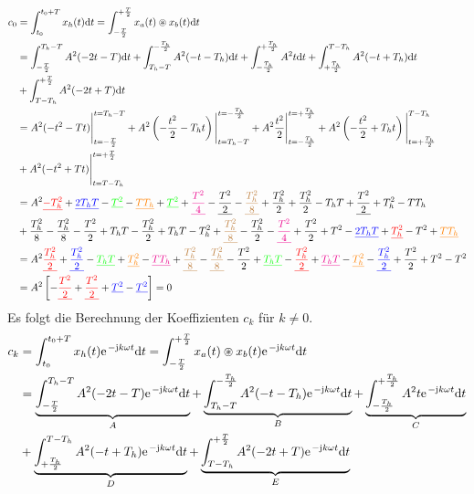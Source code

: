 \documentclass[11pt,a4paper,DIV=12]{scrartcl}
\begin{document}
\begin{align}
	c_0&=\int_{t_0}^{t_0+T}x_{h}(t)\mathrm{d} t=
	\int_{-\frac{T}{2}}^{+\frac{T}{2}}x_{a}(t)\circledast x_{b}(t)\mathrm{d} t \nonumber \\
	&=\int_{-\frac{T}{2}}^{T_h-T}A^2(-2t-T)\mathrm{d} t+\int_{T_h-T}^{-\frac{T_h}{2}}A^2(-t-T_h)\mathrm{d} t
	+\int_{-\frac{T_h}{2}}^{+\frac{T_h}{2}}A^2t\mathrm{d} t
	+\int_{+\frac{T_h}{2}}^{T-T_h}A^2(-t+T_h)\mathrm{d} t\nonumber \\
	&+\int_{T-T_h}^{+\frac{T}{2}}A^2(-2t+T)\mathrm{d} t\nonumber \\
	&=A^2(-t^2-Tt)\Bigg |_{t=-\frac{T}{2}}^{t=T_h-T}
	+A^2\left(-\frac{t^2}{2}-T_ht\right)\Bigg |_{t=T_h-T}^{t=-\frac{T_h}{2}}
	+A^2\frac{t^2}{2}\Bigg |_{t=-\frac{T_h}{2}}^{t=+\frac{T_h}{2}}
	+A^2\left(-\frac{t^2}{2}+T_ht\right)\Bigg |_{t=+\frac{T_h}{2}}^{T-T_h}\nonumber \\
	&+A^2(-t^2+Tt)\Bigg |_{t=T-T_h}^{t=+\frac{T}{2}} \nonumber \\
	&=A^2 \textcolor{red}{\underline{-T_h^2}}+\textcolor{blue}{\underline{2T_hT}}-\textcolor{green}{\underline{T^2}}-\textcolor{orange}{\underline{TT_h}}+\textcolor{green}{\underline{T^2}}+\textcolor{magenta}{\underline{\frac{T^2}{4}}}-\textcolor{black}{\underline{\frac{T^2}{2}}}-\textcolor{brown}{\underline{\frac{T_h^2}{8}}}+\frac{T_h^2}{2}+\frac{T_h^2}{2}-T_hT+\textcolor{black}{\underline{\frac{T^2}{2}}}+T_h^2-TT_h\nonumber \\
	&+\frac{T_h^2}{8}-\frac{T_h^2}{8}-\frac{T^2}{2}+T_hT-\frac{T_h^2}{2}+T_hT-T_h^2+\textcolor{brown}{\underline{\frac{T_h^2}{8}}}-\frac{T_h^2}{2}-\textcolor{magenta}{\underline{\frac{T^2}{4}}}+\frac{T^2}{2}+T^2-\textcolor{blue}{\underline{2T_hT}}+\textcolor{red}{\underline{T_h^2}}-T^2+\textcolor{orange}{\underline{TT_h}}\nonumber \\
	&=A^2\textcolor{red}{\underline{\frac{T_h^2}{2}}}+\textcolor{blue}{\underline{\frac{T_h^2}{2}}}-\textcolor{green}{\underline{T_hT}}+\textcolor{orange}{\underline{T_h^2}}-\textcolor{magenta}{\underline{TT_h}}+\textcolor{brown}{\underline{\frac{T_h^2}{8}}}-\textcolor{brown}{\underline{\frac{T_h^2}{8}}}-\frac{T^2}{2}+\textcolor{green}{\underline{T_hT}}-\textcolor{red}{\underline{\frac{T_h^2}{2}}}+\textcolor{magenta}{\underline{T_hT}}-\textcolor{orange}{\underline{T_h^2}}-\textcolor{blue}{\underline{\frac{T_h^2}{2}}}+\frac{T^2}{2}+T^2-T^2 \nonumber \\
	&=A^2\left [-\textcolor{red}{\underline{\frac{T^2}{2}}}+\textcolor{red}{\underline{\frac{T^2}{2}}}+\textcolor{blue}{\underline{T^2}}-\textcolor{blue}{\underline{T^2}}\right] = 0
\end{align}
%
%
%
Es folgt die Berechnung der Koeffizienten $c_k$ für $k\neq 0$.
%
%
%
\begin{align}
	c_k&=\int_{t_0}^{t_0+T}x_{h}(t)\e^{-\im k \omega t}\diff t
	=\int_{-\frac{T}{2}}^{+\frac{T}{2}}x_{a}(t)\circledast x_{b}(t)\e^{-\im k \omega t}\diff t\nonumber \\
	&=\underbrace{\int_{-\frac{T}{2}}^{T_h-T}A^2(-2t-T)\e^{-\im k \omega t}\diff t}_A+\underbrace{\int_{T_h-T}^{-\frac{T_h}{2}}A^2(-t-T_h)\e^{-\im k \omega t}\diff t}_B+\underbrace{\int_{-\frac{T_h}{2}}^{+\frac{T_h}{2}}A^2t\e^{-\im k \omega t}\diff t}_C\nonumber \\
	&+\underbrace{\int_{+\frac{T_h}{2}}^{T-T_h}A^2(-t+T_h)\e^{-\im k \omega t}\diff t}_D +\underbrace{\int_{T-T_h}^{+\frac{T}{2}}A^2(-2t+T)\e^{-\im k \omega t}\diff t}_E
\end{align}
\end{document}

